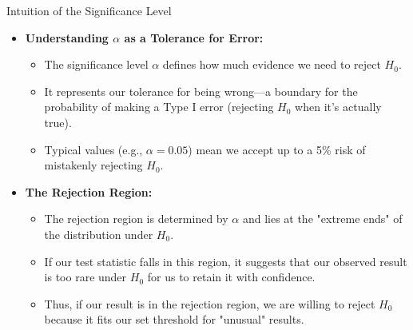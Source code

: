 \documentclass[handout]{beamer} %
\begin{document}
\begin{frame}{Intuition of the Significance Level}
    \begin{itemize}
        \item \textbf{Understanding \( \alpha \) as a Tolerance for Error:}
        \begin{itemize}
            \item The significance level \( \alpha \) defines how much evidence we need to reject \( H_0 \).
            \item It represents our tolerance for being wrong—a boundary for the probability of making a Type I error (rejecting \( H_0 \) when it’s actually true).
            \item Typical values (e.g., \( \alpha = 0.05 \)) mean we accept up to a 5\% risk of mistakenly rejecting \( H_0 \).
        \end{itemize}

        \item \textbf{The Rejection Region:}
        \begin{itemize}
            \item The rejection region is determined by \( \alpha \) and lies at the "extreme ends" of the distribution under \( H_0 \).
            \item If our test statistic falls in this region, it suggests that our observed result is too rare under \( H_0 \) for us to retain it with confidence.
            \item Thus, if our result is in the rejection region, we are willing to reject \( H_0 \) because it fits our set threshold for "unusual" results.
        \end{itemize}


    \end{itemize}
\end{frame}
\end{document}
